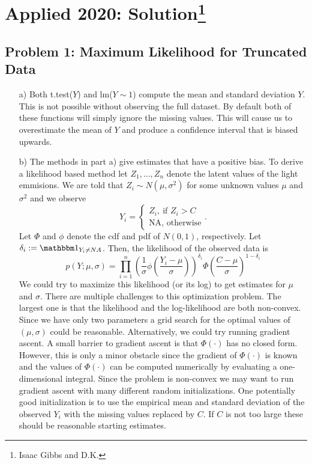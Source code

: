 \section{Applied 2020: Solution\footnote{Isaac Gibbs and D.K.}}

\subsection*{Problem 1: Maximum Likelihood for Truncated Data}

\begin{enumerate}
\item[a)]
Both t.test($Y$) and lm($Y \sim 1$) compute the mean and standard deviation $Y$. This is not possible without observing the full dataset. By default both of these functions will simply ignore the missing values. This will cause us to overestimate the mean of $Y$ and produce a confidence interval that is biased upwards.
\item[b)]
The methods in part a) give estimates that have a positive bias. To derive a likelihood based method let $Z_1,\dots,Z_n$ denote the latent values of the light emmisions. We are told that $Z_i \sim N(\mu,\sigma^2)$ for some unknown values $\mu$ and $\sigma^2$ and  we observe 
\[
Y_i = \begin{cases}
Z_i, \ \text{if } Z_i > C\\
\text{NA}, \text{ otherwise}
\end{cases}.
\] 
Let $\Phi$ and $\phi$ denote the cdf and pdf of $N(0,1)$, respectively. Let $\delta_i := \bone_{Y_i \neq NA}$. Then, the likelihood of the observed data is 
\[
p(Y;\mu,\sigma) = \prod_{i=1}^n \left( \frac{1}{\sigma} \phi\left( \frac{Y_i - \mu}{\sigma} \right) \right)^{\delta_i } \Phi\left( \frac{C - \mu}{\sigma} \right)^{1 - \delta_i} 
\]
We could try to maximize this likelihood (or its log) to get estimates for $\mu$ and $\sigma$. There are multiple challenges to this optimization problem. The largest one is that the likelihood and the log-likelihood are both non-convex. Since we have only two parameters a grid search for the optimal values of $(\mu,\sigma)$ could be reasonable. Alternatively, we could try running gradient ascent. A small barrier to gradient ascent is that $\Phi(\cdot)$ has no closed form. However, this is only a minor obstacle since the gradient of $\Phi(\cdot)$ is known and the values of $\Phi(\cdot)$ can be computed numerically by evaluating a one-dimensional integral. Since the problem is non-convex we may want to run gradient ascent with many different random initializations. One potentially good initialization is to use the empirical mean and standard deviation of the observed $Y_i$ with the missing values replaced by $C$. If $C$ is not too large these should be reasonable starting estimates.


\end{enumerate}
